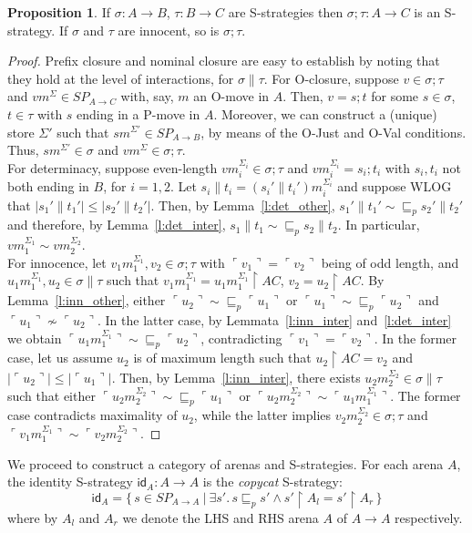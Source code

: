 \documentclass{CSML}
\theoremstyle{definition}\newtheorem{definition}[thm]{Definition}
\theoremstyle{definition}\newtheorem{example}[thm]{Example}
\theoremstyle{definition}\newtheorem{proposition}[thm]{Proposition}
\theoremstyle{definition}\newtheorem{lemma}[thm]{Lemma}
\theoremstyle{definition}\newtheorem{theorem}[thm]{Theorem}
\theoremstyle{definition}\newtheorem{corollary}[thm]{Corollary}
\theoremstyle{definition}\newtheorem{remark}[thm]{Remark}
\renewcommand\Sigma{\varSigma}
\newcommand\arr{\rightarrow}
\newcommand\rest{\upharpoonright}
\newcommand\iseq{\mathop{\|}}
\newcommand\id{\mathsf{id}}
\newcommand\Splays[1]{\mathit{SP}_{#1}}
\newcommand\prefix{\sqsubseteq_p}
\newcommand\pview[1]{\ulcorner{#1}\urcorner}
\newcommand\pv[1]{\pview{#1}}
\newcommand\makeset[1]{\{\,#1\,\}}
\begin{document}
\begin{proposition}
If $\sigma:A\arr B$, $\tau:B\arr C$ are S-strategies then $\sigma;\tau:A\arr C$ is an S-strategy.
If $\sigma$ and $\tau$ are innocent, so is $\sigma;\tau$.
\end{proposition}
\begin{proof}
Prefix closure and nominal closure are easy to establish by noting that they hold at the level of interactions, for $\sigma\iseq\tau$.
For O-closure, suppose $v\in\sigma;\tau$ and $vm^\Sigma\in\Splays{A\arr C}$ with, say, $m$ an O-move in $A$. Then, $v=s;t$ for some $s\in\sigma$, $t\in\tau$ with $s$ ending in a P-move in $A$. Moreover, we can construct a (unique) store $\Sigma'$ such that $sm^{\Sigma'}\in\Splays{A\arr B}$, by means of the O-Just and O-Val conditions. Thus, $sm^{\Sigma'}\in\sigma$ and $vm^\Sigma\in\sigma;\tau$. \\
For determinacy, suppose even-length $vm_i^{\Sigma_i}\in\sigma;\tau$ and $vm_i^{\Sigma_i}=s_i;t_i$ with $s_i,t_i$ not both ending in $B$, for $i=1,2$.
Let $s_i\iseq t_i=(s_i'\iseq t_i')m_i^{\Sigma_i}$ and suppose WLOG that $|s_1'\iseq t_1'|\leq|s_2'\iseq t_2'|$. Then, by Lemma~\ref{l:det_other}, $s_1'\iseq t_1'\sim\prefix s_2'\iseq t_2'$ and therefore, by Lemma~\ref{l:det_inter}, $s_1\iseq t_1\sim\prefix s_2\iseq t_2$. In particular, $vm_1^{\Sigma_1}\sim vm_2^{\Sigma_2}$.
\\
For innocence, let $v_1m_1^{\Sigma_1},v_2\in\sigma;\tau$ with $\pv{v_1}=\pv{v_2}$ being of odd length, and $u_1m_1^{\Sigma_1},u_2\in\sigma\iseq\tau$ such that $v_1m_1^{\Sigma_1}=u_1m_1^{\Sigma_1}\rest AC$, $v_2=u_2\rest AC$.
By Lemma~\ref{l:inn_other}, 
either $\pv{u_2}\sim\prefix\pv{u_1}$
or $\pv{u_1}\sim\prefix\pv{u_2}$ and $\pv{u_1}\not\sim\pv{u_2}$.
In the latter case, by Lemmata~\ref{l:inn_inter} and~\ref{l:det_inter} we obtain $\pv{u_1m_1^{\Sigma_1}}\sim\prefix\pv{u_2}$, contradicting $\pv{v_1}=\pv{v_2}$. 
In the former case, let us assume $u_2$ is of maximum length such that $u_2\rest AC=v_2$ and $|\pv{u_2}|\leq|\pv{u_1}|$. Then, by Lemma~\ref{l:inn_inter}, there exists $u_2m_2^{\Sigma_2}\in\sigma\iseq\tau$ such that either $\pv{u_2m_2^{\Sigma_2}}\sim\prefix\pv{u_1}$ or $\pv{u_2m_2^{\Sigma_2}}\sim \pv{u_1m_1^{\Sigma_1}}$. The former case contradicts maximality of $u_2$, while the latter implies $v_2m_2^{\Sigma_2}\in\sigma;\tau$ and $\pv{v_1m_1^{\Sigma_1}}\sim\pv{v_2m_2^{\Sigma_2}}$.
\end{proof}

We proceed to construct a category of arenas and S-strategies. For each arena $A$, the identity S-strategy $\id_A:A\arr A$ is the \emph{copycat} S-strategy:
\[
\id_A = \makeset{ s\in\Splays{A\arr A}\ |\ \exists s'.\, s\prefix s'\land s'\rest A_l=s'\rest  A_r}
\]
where by $A_l$ and $A_r$ we denote the LHS and RHS arena $A$ of $A\arr A$ respectively.
\end{document}
